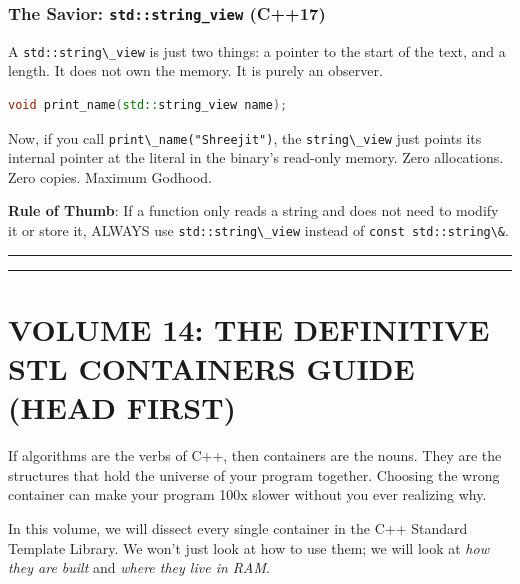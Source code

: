 \hypertarget{the-savior-stdstring_view-c17}{%
\subsubsection{\texorpdfstring{The Savior: \texttt{std::string\_view}
(C++17)}{The Savior: std::string\_view (C++17)}}\label{the-savior-stdstring_view-c17}}

A \passthrough{\lstinline!std::string\_view!} is just two things: a
pointer to the start of the text, and a length. It does not own the
memory. It is purely an observer.

\begin{lstlisting}[language={C++}]
void print_name(std::string_view name);
\end{lstlisting}

Now, if you call \passthrough{\lstinline!print\_name("Shreejit")!}, the
\passthrough{\lstinline!string\_view!} just points its internal pointer
at the literal in the binary's read-only memory. Zero allocations. Zero
copies. Maximum Godhood.

\textbf{Rule of Thumb}: If a function only reads a string and does not
need to modify it or store it, ALWAYS use
\passthrough{\lstinline!std::string\_view!} instead of
\passthrough{\lstinline!const std::string\&!}.

\begin{center}\rule{0.5\linewidth}{0.5pt}\end{center}

\begin{center}\rule{0.5\linewidth}{0.5pt}\end{center}

\hypertarget{volume-14-the-definitive-stl-containers-guide-head-first}{%
\section{VOLUME 14: THE DEFINITIVE STL CONTAINERS GUIDE (HEAD
FIRST)}\label{volume-14-the-definitive-stl-containers-guide-head-first}}

If algorithms are the verbs of C++, then containers are the nouns. They
are the structures that hold the universe of your program together.
Choosing the wrong container can make your program 100x slower without
you ever realizing why.

In this volume, we will dissect every single container in the C++
Standard Template Library. We won't just look at how to use them; we
will look at \emph{how they are built} and \emph{where they live in
RAM}.

